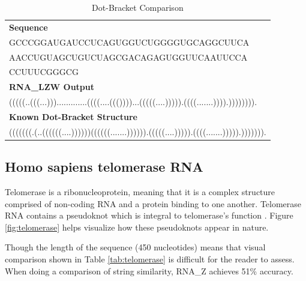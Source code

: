 \documentclass[sigconf]{acmart}
\begin{document}
\begin{table}
  \caption{Dot-Bracket Comparison}
  \label{tab:tRNA}
  \begin{tabular}{l}
    \textbf{Sequence}\\
    GCCCGGAUGAUCCUCAGUGGUCUGGGGUGCAGGCUUCA\\
    AACCUGUAGCUGUCUAGCGACAGAGUGGUUCAAUUCCA\\
    CCUUUCGGGCG\\
    \midrule
    \textbf{RNA\_LZW Output}\\
	(((((..(((...))).............((((....((())))...(((((....))))).((((.......)))).)))))))).\\
    \midrule 
    \textbf{Known Dot-Bracket Structure}\\
    (((((((.(..((((((....))))))((((((.......)))))).(((((....))))).((((.......))))).))))))).\\
\end{tabular}
\end{table}


\subsection{Homo sapiens telomerase RNA}

Telomerase is a ribonucleoprotein, meaning that it is a complex structure comprised of non-coding RNA and a protein binding to one another. Telomerase RNA contains a pseudoknot which is integral to telomerase's function \cite{ncbi}.  Figure \ref{fig:telomerase} helps visualize how these pseudoknots appear in nature.

Though the length of the sequence (450 nucleotides) means that visual comparison shown in Table \ref{tab:telomerase} is difficult for the reader to assess. When doing a comparison of string similarity, RNA\_Z achieves 51\% accuracy.
\end{document}
